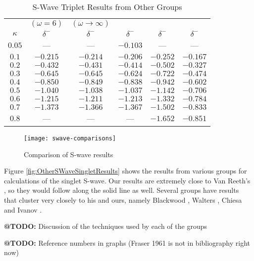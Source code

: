 \documentclass[Dissertation.tex]{subfiles}
\begin{document}
\begin{table}[H]
\begin{center}
\begin{tabular}{c c c c c c}
\toprule
 & $(\omega = 6)$ & $(\omega \rightarrow \infty)$ &  &  &   \\
$\kappa$ & $\delta^-$ \cite{VanReeth2003} & $\delta^-$ \cite{VanReeth2003} & $\delta^-$ \cite{Blackwood2002} & $\delta^-$ \cite{Ray1997} & $\delta^-$ \cite{Adhikari1999} \\
\midrule
$0.05$ & --- & --- & $-0.103$ & --- & --- \\
$0.1$ & $-0.215$ & $-0.214$ & $-0.206$ & $-0.252$ & $-0.167$ \\
$0.2$ & $-0.432$ & $-0.431$ & $-0.414$ & $-0.502$ & $-0.327$ \\
$0.3$ & $-0.645$ & $-0.645$ & $-0.624$ & $-0.722$ & $-0.474$ \\
$0.4$ & $-0.850$ & $-0.849$ & $-0.838$ & $-0.942$ & $-0.602$ \\
$0.5$ & $-1.040$ & $-1.038$ & $-1.037$ & $-1.142$ & $-0.706$ \\
$0.6$ & $-1.215$ & $-1.211$ & $-1.213$ & $-1.332$ & $-0.784$ \\
$0.7$ & $-1.373$ & $-1.366$ & $-1.367$ & $-1.502$ & $-0.833$ \\
$0.8$ &    --- &    --- &    --- & $-1.652$ & $-0.851$ \\
\bottomrule
\end{tabular}
\caption{S-Wave Triplet Results from Other Groups}
\label{tab:SWaveTripletOther}
\end{center}
\end{table}


\begin{figure}[H]
	\centering
	\texttt{[image: swave-comparisons]}
	\caption{Comparison of S-wave results}
	\label{fig:SWaveComparisons}
\end{figure}

Figure \ref{fig:OtherSWaveSingletResults} shows the results from various groups for calculations of the singlet S-wave.  Our results are extremely close to Van Reeth's \cite{VanReeth2003}, so they would follow along the solid line as well.  Several groups have results that cluster very closely to his and ours, namely Blackwood \cite{Blackwood2002}, Walters \cite{Walters2004}, Chiesa \cite{Chiesa2002} and Ivanov \cite{Ivanov2002}.

\textbf{@TODO:} Discussion of the techniques used by each of the groups

\textbf{@TODO:} Reference numbers in graphs (Fraser 1961 \cite{Fraser1961a} is not in bibliography right now)
\end{document}
